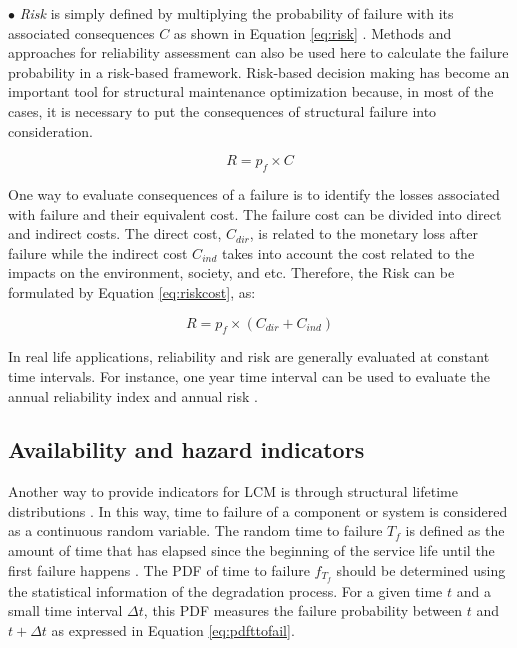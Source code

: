 
$\bullet$ \textit{Risk} is simply defined by multiplying the probability of failure with its associated consequences $C$ as shown in Equation \ref{eq:risk} \citep{BARONE201421}.
Methods and approaches for reliability assessment can also be used here to calculate the failure probability in a risk-based framework.
Risk-based decision making has become an important tool for structural maintenance optimization because, in most of the cases, it is necessary to put the consequences of 
structural failure into consideration.  

\begin{equation}
 R = p_f\times C
 \label{eq:risk}
\end{equation}

\noindent
One way to evaluate consequences of a failure is to identify the losses associated with failure and their equivalent cost. The failure cost can be divided into direct and indirect costs. The 
direct cost, $C_{dir}$, is related to the monetary loss after failure while the indirect cost $C_{ind}$ takes into account the cost related to the impacts on the environment, society, and etc. 
Therefore, the Risk can be formulated by Equation \ref{eq:riskcost}, as:

\begin{equation}
 R = p_f\times (C_{dir}+C_{ind})
 \label{eq:riskcost}
\end{equation}

\noindent
In real life applications, reliability and risk are generally evaluated at constant time intervals. For instance, one year time interval can be used to evaluate the annual reliability index and annual risk
\cite{BARONE201421}. 

\subsection{Availability and hazard indicators}
\noindent
Another way to provide indicators for LCM is through structural lifetime distributions \citep{Leemis}. In this way, time to failure of a component or system is considered as a continuous random variable. 
The random time to failure $T_f$ is defined as the amount of time that has elapsed since the beginning of the service life until the first failure happens \citep{Rausand2003}. The PDF of time to failure 
$f_{T_f}$ should be determined using the statistical information of the degradation process. For a given time $t$ and a small time interval $\Delta t$, this PDF measures the failure probability between 
$t$ and $t+\Delta t$ as expressed in Equation \ref{eq:pdfttofail}. 

